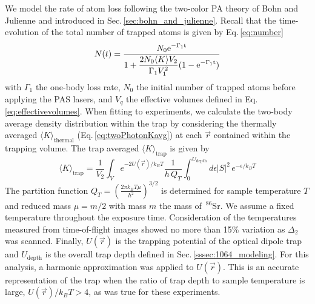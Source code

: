 We model the rate of atom loss following the two-color PA theory of Bohn and Julienne and introduced in Sec.\,\ref{sec:bohn_and_julienne}.
Recall that the time-evolution of the total number of trapped atoms is given by Eq.\,\ref{eq:number}
\begin{equation*} \label{eq:4num}
   N(t)= \frac{ \displaystyle N_0 \rm{e}^{-\Gamma_1 t}}
   		{ \displaystyle 1 + \frac{2 N_0 \langle K \rangle V_2}{\Gamma_1 V_1^2}(1-\rm{e}^{-\Gamma_1 t}) }
\end{equation*}
with $\Gamma_1$ the one-body loss rate, $N_0$ the initial number of trapped atoms before applying the PAS lasers, and $V_q$ the effective volumes defined in Eq.\,\ref{eq:effectivevolumes}.
When fitting to experiments, we calculate the two-body average density distribution within the trap by considering the thermally averaged $\langle K \rangle_{\text{thermal}}$ (Eq.\,\ref{eq:twoPhotonKavg}) at each $\vec{r}$ contained within the trapping volume.
The trap averaged $\langle K \rangle_\text{trap}$ is given by
\begin{equation} \label{eq:chap4avgK}
	\langle K \rangle_\text{trap} = \frac{1}{V_2} \int_V e^{-2 U(\vec{r})/k_{B}T} \frac{1}{h\,Q_{T}} \int_{0}^{U_\text{depth}} d\epsilon \vert S \vert^2 \,e^{-\epsilon/k_{B}T}
\end{equation}
The partition function $Q_{T}=\left( \frac{2\pi k_{B}T \mu}{ h^2 }\right) ^{3/2}$ is determined for sample temperature $T$ and reduced mass $\mu = m/2$ with mass $m$ the mass of $\,^{86}$Sr.
We assume a fixed temperature throughout the exposure time.
Consideration of the temperatures measured from time-of-flight images showed no more than 15\% variation as $\Delta_2$ was scanned.
Finally, $U(\vec{r})$ is the trapping potential of the optical dipole trap and $U_{\text{depth}}$ is the overall trap depth defined in Sec.\,\ref{sssec:1064_modeling}.
For this analysis, a harmonic approximation was applied to $U(\vec{r})$.
This is an accurate representation of the trap when the ratio of trap depth to sample temperature is large, $U(\vec{r})/k_B T > 4$, as was true for these experiments.

